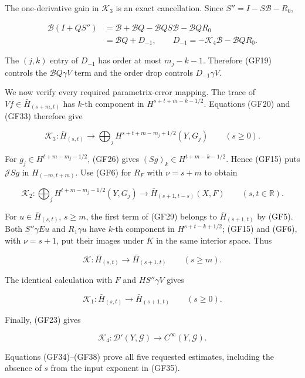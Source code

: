 \documentclass[
  11pt,
]{article}
\makeatletter
\let\ReaderOriginalAnchorStart\hyper@anchorstart
\let\ReaderOriginalAnchorEnd\hyper@anchorend
\let\ReaderPendingAliases\@empty
\def\ReaderArmAliases#1{\gdef\ReaderPendingAliases{#1}}
\def\hyper@anchorstart#1{\ReaderIfNativeAnchorTF{#1}{\ReaderPendingAliases\global\let\ReaderPendingAliases\@empty}{}\ReaderOriginalAnchorStart{#1}}
\makeatother
\begin{document}
The one-derivative gain in \(\mathscr K_3\) is an exact cancellation.
Since \(S''=I-S\mathcal B-R_0\),

\[
 \begin{aligned}
 \mathcal B(I+QS'')
 &=\mathcal B+\mathcal BQ-\mathcal BQS\mathcal B-\mathcal BQR_0\\
 &=\mathcal BQ+D_{-1},
 \qquad
 D_{-1}=-\mathscr K_4\mathcal B-\mathcal BQR_0.
 \end{aligned}
 \tag{GF33}
\]

The \((j,k)\) entry of \(D_{-1}\) has order at most \(m_j-k-1\).
Therefore (GF19) controls the \(\mathcal BQ\gamma V\) term and the order
drop controls \(D_{-1}\gamma V\).

We now verify every required parametrix-error mapping. The trace of
\(Vf\in\bar H_{(s+m,t)}\) has \(k\)-th component in \(H^{s+t+m-k-1/2}\).
Equations (GF20) and (GF33) therefore give

\[
 \mathscr K_3:\bar H_{(s,t)}\longrightarrow
 \bigoplus_jH^{s+t+m-m_j+1/2}(Y,G_j)
 \qquad(s\geq0).
 \tag{GF34}
\]

For \(g_j\in H^{t+m-m_j-1/2}\), (GF26) gives
\((Sg)_k\in H^{t+m-k-1/2}\). Hence (GF15) puts \(\mathcal JSg\) in
\(H_{(-m,t+m)}\). Use (GF6) for \(R_F\) with \(\nu=s+m\) to obtain

\[
 \mathscr K_2:
 \bigoplus_jH^{t+m-m_j-1/2}(Y,G_j)
 \longrightarrow\bar H_{(s+1,t-s)}(X,F)
 \qquad(s,t\in\mathbb R).
 \tag{GF35}
\]

For \(u\in\bar H_{(s,t)}\), \(s\geq m\), the first term of (GF29)
belongs to \(\bar H_{(s+1,t)}\) by (GF5). Both \(S''\gamma Eu\) and
\(R_1\gamma u\) have \(k\)-th component in \(H^{s+t-k+1/2}\); (GF15) and
(GF6), with \(\nu=s+1\), put their images under \(K\) in the same
interior space. Thus

\[
 \mathscr K:\bar H_{(s,t)}\longrightarrow\bar H_{(s+1,t)}
 \qquad(s\geq m).
 \tag{GF36}
\]

The identical calculation with \(F\) and \(HS''\gamma V\) gives

\[
 \mathscr K_1:\bar H_{(s,t)}\longrightarrow\bar H_{(s+1,t)}
 \qquad(s\geq0).
 \tag{GF37}
\]

Finally, (GF23) gives

\[
 \mathscr K_4:\mathcal D'(Y,\mathcal G)\longrightarrow C^\infty(Y,\mathcal G).
 \tag{GF38}
\]

Equations (GF34)--(GF38) prove all five requested estimates, including
the absence of \(s\) from the input exponent in (GF35).

\ReaderArmAliases{\ReaderOriginalAnchorStart{AN03-GCF-007}\ReaderOriginalAnchorEnd\begingroup\expandafter\def\csname @currentHref\endcsname{AN03-GCF-007}\label{AN03-GCF-007}\endgroup\ReaderOriginalAnchorStart{7-one-derivative-at-a-time-for-solutions}\ReaderOriginalAnchorEnd\begingroup\expandafter\def\csname @currentHref\endcsname{7-one-derivative-at-a-time-for-solutions}\label{7-one-derivative-at-a-time-for-solutions}\endgroup\ReaderOriginalAnchorStart{one-derivative-at-a-time-for-solutions}\ReaderOriginalAnchorEnd}
\end{document}
